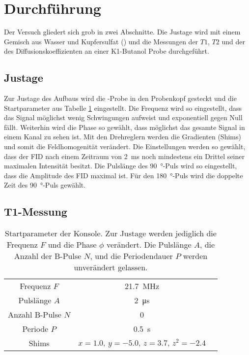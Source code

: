 \section{Durchführung}
Der Versuch gliedert sich grob in zwei Abschnitte. Die Justage wird mit einem Gemisch aus Wasser und Kupfersulfat () und die Messungen der $T1$, $T2$ und der des Diffusionskoeffizienten an einer K1-Butanol Probe durchgeführt.

\subsection{Justage}
Zur Justage des Aufbaus wird die -Probe in den Probenkopf gesteckt und die Startparameter aus Tabelle \ref{tab:Startparameter} eingestellt.
Die Frequenz wird so eingestellt, dass das Signal möglichst wenig Schwingungen aufweist und exponentiell gegen Null fällt.
Weiterhin wird die Phase so gewählt, dass möglichst das gesamte Signal in einem Kanal zu sehen ist.
Mit den Drehreglern werden die Gradienten (Shims) und somit die Feldhomogenität verändert. Die Einstellungen werden so gewählt, dass der FID nach einem Zeitraum von \SI{2}{\milli\second} noch mindestens ein Drittel seiner maximalen Intensität besitzt.
Die Pulslänge des \SI{90}{\degree}-Puls wird so eingestellt, dass die Amplitude des FID maximal ist. Für den \SI{180}{\degree}-Puls wird die doppelte Zeit des \SI{90}{\degree}-Puls gewählt.

\subsection{T1-Messung}






\begin{table}[H]
  \centering
  \caption{Startparameter der Konsole. Zur Justage werden jediglich die Frequenz $F$ und die Phase $\phi$ verändert. Die Pulslänge $A$, die Anzahl der B-Pulse $N$, und die Periodendauer $P$ werden unverändert gelassen.}
  \label{tab:Startparameter}
  \begin{tabular}{ccc}
    \toprule
    Frequenz $F$ & \SI{21.7}{\mega\hertz} \\
    Pulslänge $A$ & \SI{2}{\micro\second} \\
    Anzahl B-Pulse $N$ & 0 \\
    Periode $P$ & \SI{0.5}{\second} \\
    Shims & $x = \num{1.0}, \,  y = \num{-5.0}, \, z = \num{3.7}, \, z^2 = \num{-2.4}$ \\
    \bottomrule
  \end{tabular}
\end{table}
